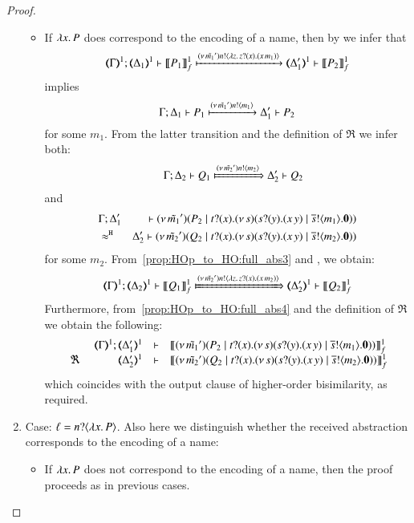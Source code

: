 \begin{proof}
\begin{enumerate}[1.]
\begin{itemize}
	\item If $\lambda x.\,P$ does correspond to the encoding of a name, then by  we infer that 
%
	\[
		\horel{\mapt{\Gamma}^{1}}{\mapt{\Delta_1}^{1}}{\pmapp{P_1}{1}{f}}{\hby{\news{\tilde{m_1}'} \bactout{n}{\abs{z}{\binp{z}{x} (\appl{x}{m_1})}}}}{\mapt{\Delta_1'}^{1}}{\pmapp{P_2}{1}{f}}
	\]
%
	\noi implies
%
	\[
		\Gamma; \Delta_1 \vdash P_1 \xmapsto{(\nu\, \tilde{m_1}') n !\langle m_1 \rangle} \Delta_1' \vdash P_2
	\]
%
	for some $m_1$. From the latter transition and the definition of $\Re$ we infer both:
%
	\begin{eqnarray}
		&&\horel{\Gamma}{\Delta_2}{Q_1}{\Hby{\news{\tilde{m_2}'} \bactout{n}{m_2}}}{\Delta_2'}{Q_2}
		\label{prop:HOp_to_HO:full_abs3}
	\end{eqnarray}
%
	\noi and
%
	\begin{eqnarray}
		& \Gamma; \Delta_1' & \vdash (\nu\, \tilde{m_1}')(P_2 \;|\; t ? (x) . (\nu\, s)(s ? (y) . (x\, {y}) \;|\; \overline{s} ! \langle m_1 \rangle . \mathbf{0})) \nonumber \\
		& \approx^\mathtt{H} & \Delta_2' \vdash (\nu\, \tilde{m_2}')(Q_2 \;|\; t ? (x) . (\nu\, s)(s ? (y) . (x\, {y}) \;|\; \overline{s} ! \langle m_2 \rangle . \mathbf{0}))
		\label{prop:HOp_to_HO:full_abs4}
	\end{eqnarray}
%
	\noi for some $m_2$. From~\eqref{prop:HOp_to_HO:full_abs3} and , we obtain:
%
	\[
		\horel{\mapt{\Gamma}^{1}}{\mapt{\Delta_2}^{1}}{\pmapp{Q_1}{1}{f}}{\Hby{\news{\tilde{m_2}'} \bactout{n}{\abs{z}{\binp{z}{x} (\appl{x}{m_2})}}}}{\mapt{\Delta_2'}^{1}}{\pmapp{Q_2}{1}{f}}
	\]
%
	\noi Furthermore, from~\eqref{prop:HOp_to_HO:full_abs4} and the definition of $\Re$ we obtain the following:
%
	\[
		\mhorel{\mapt{\Gamma}^{1}}{\mapt{\Delta_1'}^{1}}{\pmapp{\newsp{\tilde{m_1}'}{P_2 \Par \hotrigger{t}{x}{s}{m_1}}}{1}{f}}
		{\ \Re\ }{\mapt{\Delta_2'}^{1}}{}{\pmapp{\newsp{\tilde{m_2}'}{Q_2 \Par \hotrigger{t}{x}{s}{m_2}}}{1}{f}}
	\]
%
	\noi which coincides with the output clause of higher-order bisimilarity, as required.
	\end{itemize}

	\item Case: $\ell = n ? \langle \lambda x.\,P \rangle$. Also here we distinguish whether the received abstraction corresponds to the encoding of a name: 

	\begin{itemize} 
	\item If $\lambda x.\,P$ does not correspond to the encoding of a name, then the proof proceeds as in previous cases.
	

\end{itemize}
\end{enumerate}
\end{proof}
